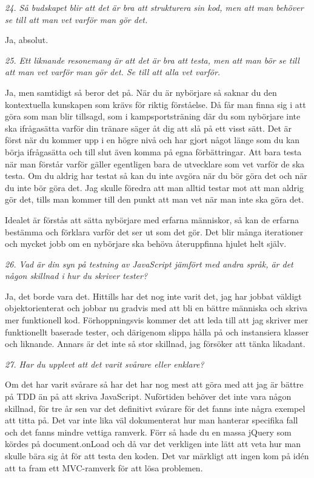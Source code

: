 \documentclass[11pt]{article}
\begin{document}
\emph{24. Så budskapet blir att det är bra att strukturera sin kod, men att man behöver se till att man vet varför man gör det.}

Ja, absolut.

\emph{25. Ett liknande resonemang är att det är bra att testa, men att man bör se till att man vet varför man gör det. Se till att alla vet varför.}

Ja, men samtidigt så beror det på. När du är nybörjare så saknar du den kontextuella kunskapen som krävs för riktig förståelse. Då får man finna sig i att göra som man blir tillsagd, som i kampsportsträning där du som nybörjare inte ska ifrågasätta varför din tränare säger åt dig att slå på ett visst sätt. Det är först när du kommer upp i en högre nivå och har gjort något länge som du kan börja ifrågasätta och till slut även komma på egna förbättringar. Att bara testa när man förstår varför gäller egentligen bara de utvecklare som vet varför de ska testa. Om du aldrig har testat så kan du inte avgöra när du bör göra det och när du inte bör göra det. Jag skulle föredra att man alltid testar mot att man aldrig gör det, tills man kommer till den punkt att man vet när man inte ska göra det.

Idealet är förstås att sätta nybörjare med erfarna människor, så kan de erfarna bestämma och förklara varför det ser ut som det gör. Det blir många iterationer och mycket jobb om en nybörjare ska behöva återuppfinna hjulet helt själv.

\emph{26. Vad är din syn på testning av JavaScript jämfört med andra språk, är det någon skillnad i hur du skriver tester?}

Ja, det borde vara det. Hittills har det nog inte varit det, jag har jobbat väldigt objektorienterat och jobbar nu gradvis med att bli en bättre människa och skriva mer funktionell kod. Förhoppningsvis kommer det att leda till att jag skriver mer funktionellt baserade tester, och därigenom slippa hålla på och instansiera klasser och liknande. Annars är det inte så stor skillnad, jag försöker att tänka likadant.

\emph{27. Har du upplevt att det varit svårare eller enklare?}

Om det har varit svårare så har det har nog mest att göra med att jag är bättre på TDD än på att skriva JavaScript. Nuförtiden behöver det inte vara någon skillnad, för tre år sen var det definitivt svårare för det fanns inte några exempel att titta på. Det var inte lika väl dokumenterat hur man hanterar specifika fall och det fanns mindre vettiga ramverk. Förr så hade du en massa jQuery som kördes på document.onLoad och då var det verkligen inte lätt att veta hur man skulle bära sig åt för att testa den koden. Det var märkligt att ingen kom på idén att ta fram ett MVC-ramverk för att lösa problemen.
\end{document}
